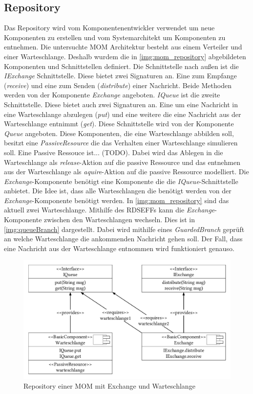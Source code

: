 \subsection{Repository}
Das Repository wird vom Komponentenentwickler verwendet um neue Komponenten zu erstellen und vom Systemarchitekt um Komponenten zu entnehmen. Die untersuchte MOM Architektur besteht aus einem Verteiler und einer Warteschlange. Deshalb wurdem die in \autoref{img:mom_repository} abgebildeten Komponenten und Schnittstellen definiert. Die Schnittstelle nach außen ist die \emph{IExchange} Schnittstelle. Diese bietet zwei Signaturen an. Eine zum Empfange (\emph{receive}) und eine zum Senden (\emph{distribute}) einer Nachricht. Beide Methoden werden von der Komponente \emph{Exchange} angeboten. \emph{IQueue} ist die zweite Schnittstelle. Diese bietet auch zwei Signaturen an. Eine um eine Nachricht in eine Warteschlange abzulegen (\emph{put}) und eine weitere die eine Nachricht aus der Warteschlange entnimmt (\emph{get}). Diese Schnittstelle wird von der Komponente \emph{Queue} angeboten. Diese Komponenten, die eine Warteschlange abbilden soll, besitzt eine \emph{PassiveResource} die das Verhalten einer Warteschlange simulieren soll. Eine Passive Ressouce ist... (TODO). Dabei wird das Ablegen in die Warteschlange als \emph{release}-Aktion auf die passive Ressource und das entnehmen aus der Warteschlange als \emph{aquire}-Aktion auf die passive Ressource modelliert. Die \emph{Exchange}-Komponente benötigt eine Komponente die die \emph{IQueue}-Schnittstelle anbietet. Die Idee ist, dass alle Warteschlangen die benötigt werden von der \emph{Exchange}-Komponente benötigt werden. In \autoref{img:mom_repository} sind das aktuell zwei Warteschlange. Mithilfe des RDSEFFs kann die \emph{Exchange}-Komponente zwischen den Warteschlangen wechseln. Dies ist in \autoref{img:queueBranch} dargestellt. Dabei wird mithilfe eines \emph{GuardedBranch} geprüft an welche Warteschlange die ankommenden Nachricht gehen soll. Der Fall, dass eine Nachricht aus der Warteschlange entnommen wird funktioniert genauso. 




\begin{figure}
\center
  \includegraphics[width=1\textwidth]{images/modelling/modelingRepository.pdf}
  \caption{Repository einer MOM mit Exchange und Warteschlange}
  \label{img:mom_repository}
\end{figure}

